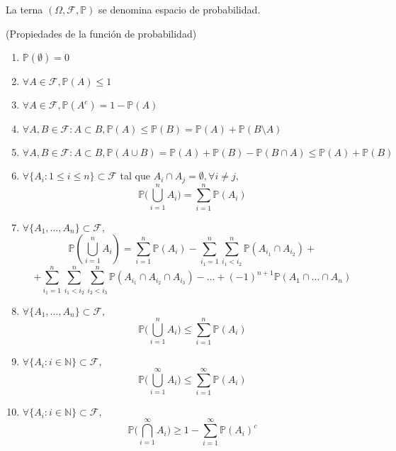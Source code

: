 \begin{ejr}

\end{ejr}

\begin{ejr}

\end{ejr}

\begin{defn}
La terna $(\Omega,\mathcal{F},\mathbb{P})$ se denomina espacio de probabilidad.
\end{defn}

\begin{prop}(Propiedades de la función de probabilidad)\\
\begin{enumerate}[label=(\roman*)]
    \item $\mathbb{P}(\emptyset) = 0$
    \item $\forall A \in \mathcal{F}, \mathbb{P}(A) \leq 1$
    \item $\forall A \in \mathcal{F}, \mathbb{P}(A^c) = 1 - \mathbb{P}(A)$
    \item $\forall A,B \in \mathcal{F}: A\subset B, \mathbb{P}(A)\leq \mathbb{P}(B) = \mathbb{P}(A) + \mathbb{P}(B\setminus A)$
    \item $\forall A,B \in \mathcal{F}: A\subset B, \mathbb{P}(A\cup B) = \mathbb{P}(A) + \mathbb{P}(B) - \mathbb{P}(B\cap A) \leq \mathbb{P}(A) + \mathbb{P}(B)$
    \item $\forall \{A_i: 1\leq i \leq n \}\subset\mathcal{F}$ tal que $A_i \cap A_j = \emptyset, \forall i\neq j,$ \[ \mathbb{P}\bigg(\bigcup_{i=1}^n A_i \bigg) = \sum_{i=1}^n \mathbb{P}(A_i) \]
    \item $\forall \{A_1,...,A_n\} \subset \mathcal{F},$ \[\mathbb{P}(\bigcup^{n}_{i=1} A_i) = \sum^{n}_{i=1} \mathbb{P}(A_i)  - \sum^{n}_{i_1=1}\sum^{n}_{i_1<i_2} \mathbb{P}(A_{i_1} \cap A_{i_2})+\] \[ + \sum^{n}_{i_1=1}\sum^{n}_{i_1<i_2}\sum^{n}_{i_2<i_3} \mathbb{P}(A_{i_1} \cap A_{i_2} \cap A_{i_3}) - ... + (-1)^{n+1} \mathbb{P}(A_1 \cap ... \cap A_n)\]
    \item $\forall \{A_1,...,A_n\} \subset \mathcal{F},$ \[ \mathbb{P}\bigg(\bigcup_{i=1}^n A_i \bigg) \leq \sum_{i=1}^n \mathbb{P}(A_i) \]
    \item $\forall \{A_i: i\in\mathbb{N} \}\subset\mathcal{F},$ \[ \mathbb{P}\bigg(\bigcup_{i=1}^\infty A_i \bigg) \leq \sum_{i=1}^\infty \mathbb{P}(A_i) \]
    \item $\forall \{A_i: i\in\mathbb{N}\}\subset\mathcal{F},$ \[ \mathbb{P}\bigg(\bigcap_{i=1}^\infty A_i \bigg) \geq 1 - \sum_{i=1}^\infty \mathbb{P}(A_i)^c \]
\end{enumerate}
\end{prop}

